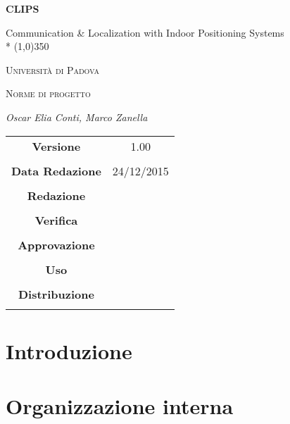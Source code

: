 \documentclass[a4paper,twoside,12pt]{article}
\author{Oscar Elia Conti, Marco Zanella}
\date{24/12/2015}
\begin{document}
\begin{titlepage}
	\centering
	{\huge\bfseries CLIPS\par}
	Communication \& Localization with Indoor Positioning Systems \\*
	\line(1,0){350} \\
	{\scshape\LARGE Università di Padova \par}
	\vspace{1cm}
	{\scshape\Large Norme di progetto\par}
	\vspace{1.5cm}
	
	\vspace{2cm}
	{\Large\itshape Oscar Elia Conti, Marco Zanella\par}
	
	\vfill \vfill
	\begin{tabular}{c|c}
	{\hfill \textbf{Versione}} & 1.00\\ \\
	{\hfill\textbf{Data Redazione}} & 24/12/2015  \\ \\
	{\hfill\textbf{Redazione}} &  \\ \\
	{\hfill\textbf{Verifica}} &  \\ \\
	{\hfill\textbf{Approvazione}} &  \\ \\
	{\hfill\textbf{Uso}} & \\ \\
	{\hfill\textbf{Distribuzione}} & \\ \\
	\end{tabular}
\end{titlepage}
	
	\newpage

	\tableofcontents

	\newpage
	
	\newpage
	\section{Introduzione}
		


	\newpage
	\section{Organizzazione interna}
		
	
\end{document}

